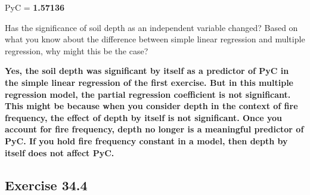 \documentclass[
  openany]{krantz}
\begin{document}
PyC = \textbf{1.57136}

Has the significance of soil depth as an independent variable changed? Based on what you know about the difference between simple linear regression and multiple regression, why might this be the case?

\textbf{Yes, the soil depth was significant by itself as a predictor of PyC in the simple linear regression of the first exercise. But in this multiple regression model, the partial regression coefficient is not significant. This might be because when you consider depth in the context of fire frequency, the effect of depth by itself is not significant. Once you account for fire frequency, depth no longer is a meaningful predictor of PyC. If you hold fire frequency constant in a model, then depth by itself does not affect PyC.}

\hypertarget{exercise-34.4}{%
\subsection{Exercise 34.4}\label{exercise-34.4}}
\end{document}
